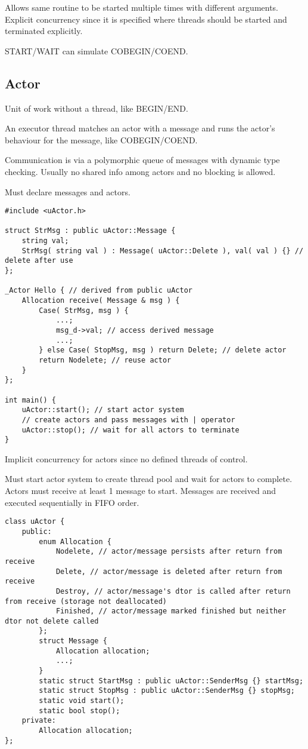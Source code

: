\documentclass[11pt]{article}
\begin{document}
Allows same routine to be started multiple times with different arguments.
Explicit concurrency since it is specified where threads should be started and terminated explicitly.

START/WAIT can simulate COBEGIN/COEND.
\subsection{Actor}
\label{sec:orgf63522a}
Unit of work without a thread, like BEGIN/END.

An executor thread matches an actor with a message and runs the actor's behaviour for the message, like
COBEGIN/COEND.

Communication is via a polymorphic queue of messages with dynamic type checking.
Usually no shared info among actors and no blocking is allowed.

Must declare messages and actors.
\begin{verbatim}
#include <uActor.h>

struct StrMsg : public uActor::Message {
    string val;
    StrMsg( string val ) : Message( uActor::Delete ), val( val ) {} // delete after use
};

_Actor Hello { // derived from public uActor
    Allocation receive( Message & msg ) {
        Case( StrMsg, msg ) {
            ...;
            msg_d->val; // access derived message
            ...;
        } else Case( StopMsg, msg ) return Delete; // delete actor
        return Nodelete; // reuse actor
    }
};

int main() {
    uActor::start(); // start actor system
    // create actors and pass messages with | operator
    uActor::stop(); // wait for all actors to terminate
}
\end{verbatim}

Implicit concurrency for actors since no defined threads of control.

Must start actor system to create thread pool and wait for actors to complete.
Actors must receive at least 1 message to start.
Messages are received and executed sequentially in FIFO order.

\begin{verbatim}
class uActor {
    public:
        enum Allocation {
            Nodelete, // actor/message persists after return from receive
            Delete, // actor/message is deleted after return from receive
            Destroy, // actor/message's dtor is called after return from receive (storage not deallocated)
            Finished, // actor/message marked finished but neither dtor not delete called
        };
        struct Message {
            Allocation allocation;
            ...;
        }
        static struct StartMsg : public uActor::SenderMsg {} startMsg;
        static struct StopMsg : public uActor::SenderMsg {} stopMsg;
        static void start();
        static bool stop();
    private:
        Allocation allocation;
};
\end{verbatim}
\end{document}
